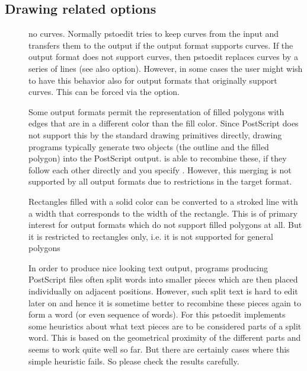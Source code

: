 \documentclass[english,a4paper]{article}
\begin{document}
\subsection{Drawing related options}
\begin{description}
\item[]
no curves.
Normally pstoedit tries to keep curves from the input and transfers them to the output if the output format supports curves. If the output format does not support curves, then pstoedit replaces curves by a series of lines (see also  option). However, in some cases the user might wish to have this behavior also for output formats that originally support curves. This can be forced via the  option.


\item[]
Some output formats permit the representation of filled polygons with edges that are in a different color than the fill color. Since PostScript does not support this by the standard drawing primitives directly, drawing programs typically generate two objects (the outline and the filled polygon) into the PostScript output.  is able to recombine these, if they follow each other directly and you specify . However, this merging is not supported by all output formats due to restrictions in the target format.


\item[]
Rectangles filled with a solid color can be converted to a stroked line with a width that corresponds to the width of the rectangle. This is of primary interest for output formats which do not support filled polygons at all. But it is restricted to rectangles only, i.e. it is not supported for general polygons


\item[]
In order to produce nice looking text output, programs producing PostScript files often split words into smaller pieces which are then placed individually on adjacent positions. However, such split text is hard to edit later on and hence it is sometime better to recombine these pieces again to form a word (or even sequence of words). For this pstoedit implements some heuristics about what text pieces are to be considered parts of a split word. This is based on the geometrical proximity of the different parts and seems to work quite well so far. But there are certainly cases where this simple heuristic fails. So please check the results carefully.



\end{description}
\end{document}
